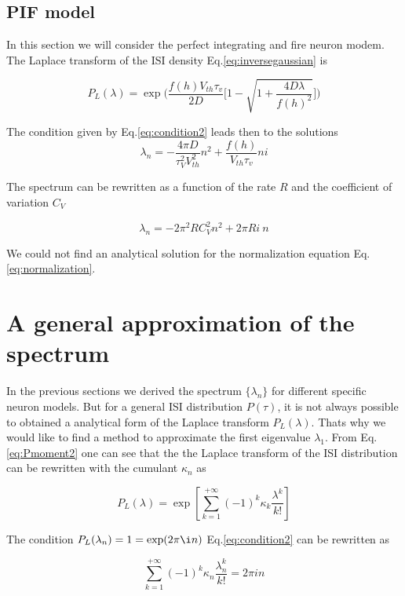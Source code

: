 \documentclass[12pt,twoside]{report}
\begin{document}
\subsection{PIF model}

In this section we will consider the perfect integrating and fire neuron modem. The Laplace transform of the ISI density Eq.\eqref{eq:inversegaussian} is

\begin{equation}
P_L(\lambda)=\exp\big(\frac{f(h) V_{th}\tau_v}{2D}\big[1-\sqrt{1+\frac{4D\lambda}{f(h)^2}}\big]\big)
\end{equation}


The condition given by Eq.\eqref{eq:condition2} leads then to the solutions
\begin{equation}
\lambda_n=-\frac{4\pi D}{\tau_V^2V_{th}^2}n^2+\frac{f(h)}{V_{th}\tau_v}ni
\end{equation}

The spectrum can be rewritten as a function of the rate $R$ and the coefficient of variation $C_V$

\begin{equation}
\lambda_n=- 2\pi^2RC_V^2n^2+2\pi R i\:n
\end{equation}

We could not find an analytical solution for the normalization equation Eq.\eqref{eq:normalization}.

\section{A general approximation of the spectrum}
\label{sec:eigv}
In the previous sections we derived the spectrum $\{\lambda_n\}$ for different specific neuron models. But for a general ISI distribution $P(\tau)$, it is not always possible to obtained a analytical form of the Laplace transform $P_L(\lambda)$. Thats why we would like to find a method to approximate the first eigenvalue $\lambda_1$. From Eq.\eqref{eq:Pmoment2} one can see that the the Laplace transform of the ISI distribution can be rewritten with the cumulant $\kappa_n$ as

\begin{equation}
\label{eq:PLcum}
P_L(\lambda)=\exp\left[ \sum_{k=1}^{+\infty}(-1)^k\kappa_k \frac{\lambda^k}{k!}\right]
\end{equation}

The condition $P_L(\lambda_n)=1=\exp(2\pi \i n)$ Eq.\eqref{eq:condition2} can be rewritten as


\begin{equation}
\label{eq:cum2pi}
\sum_{k=1}^{+\infty}(-1)^k\kappa_n \frac{\lambda_n^k}{k!}=2 \pi i n
\end{equation}
\end{document}
